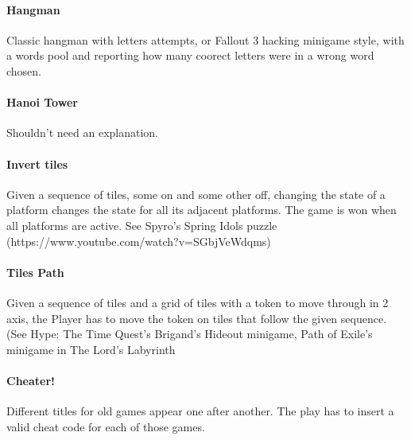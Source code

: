 
\paragraph{Hangman} Classic hangman with letters attempts, or Fallout 3 hacking minigame style, with a words pool and reporting how many coorect letters were in a wrong word chosen.

\paragraph{Hanoi Tower} Shouldn't need an explanation.

\paragraph{Invert tiles} Given a sequence of tiles, some on and some other off, changing the state of a platform changes the state for all its adjacent platforms. The game is won when all platforms are active. See Spyro's Spring Idols puzzle (https://www.youtube.com/watch?v=SGbjVeWdqms)


\paragraph{Tiles Path} Given a sequence of tiles and a grid of tiles with a token to move through in 2 axis, the Player has to move the token on tiles that follow the given sequence. (See Hype: The Time Quest's Brigand's Hideout minigame, Path of Exile's minigame in The Lord's Labyrinth


\paragraph{Cheater!} Different titles for old games appear one after another. The play has to insert a valid cheat code for each of those games.


\pagebreak
